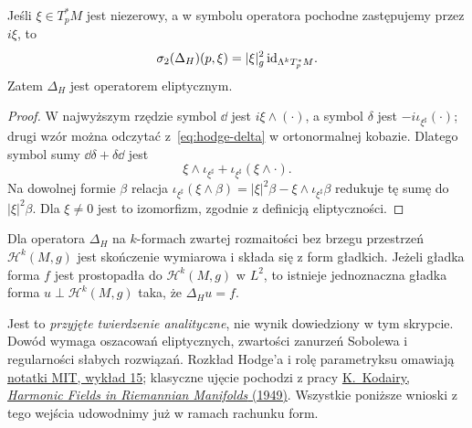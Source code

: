 \begin{stwierdzenie}
\label{prop:hodge-symbol}
Jeśli $\xi\in T_p^*M$ jest niezerowy, a w symbolu operatora
pochodne zastępujemy przez $i\xi$, to
\begin{equation}\label{eq:hodge-symbol}
 \sigma_2(\Delta_H)(p,\xi)
 =|\xi|_g^2\,\mathrm{id}_{\Lambda^kT_p^*M}.
\end{equation}
Zatem $\Delta_H$ jest operatorem eliptycznym.
\end{stwierdzenie}
\begin{proof}
W najwyższym rzędzie symbol $\dd$ jest
$i\xi\wedge(\cdot)$, a symbol $\delta$ jest
$-i\iota_{\xi^\sharp}(\cdot)$; drugi wzór można
odczytać z~\eqref{eq:hodge-delta} w ortonormalnej kobazie.
Dlatego symbol sumy $\dd\delta+\delta\dd$ jest
\[
 \xi\wedge\iota_{\xi^\sharp}
 +\iota_{\xi^\sharp}(\xi\wedge\cdot).
\]
Na dowolnej formie $\beta$ relacja
$\iota_{\xi^\sharp}(\xi\wedge\beta)
=|\xi|^2\beta-\xi\wedge\iota_{\xi^\sharp}\beta$
redukuje tę sumę do $|\xi|^2\beta$. Dla $\xi\ne0$
jest to izomorfizm, zgodnie z definicją eliptyczności.
\end{proof}

\begin{twierdzenie}
\label{thm:hodge-analytic-input}
Dla operatora $\Delta_H$ na $k$-formach zwartej
rozmaitości bez brzegu przestrzeń $\mathcal H^k(M,g)$
jest skończenie wymiarowa i składa się z form gładkich.
Jeżeli gładka forma $f$ jest prostopadła do
$\mathcal H^k(M,g)$ w $L^2$, to istnieje jednoznaczna
gładka forma $u\perp\mathcal H^k(M,g)$ taka, że
$\Delta_Hu=f$.
\end{twierdzenie}

Jest to \emph{przyjęte twierdzenie analityczne},
nie wynik dowiedziony w tym skrypcie. Dowód wymaga
oszacowań eliptycznych, zwartości zanurzeń Sobolewa i
regularności słabych rozwiązań. Rozkład Hodge'a i rolę
parametryksu omawiają
\href{https://ocw.mit.edu/courses/18-966-geometry-of-manifolds-spring-2007/d6848bb391c032ef27993e984fef4558_lect15.pdf}
{notatki MIT, wykład 15}; klasyczne ujęcie pochodzi z pracy
\href{https://doi.org/10.2307/1969552}
{K.\ Kodairy, \emph{Harmonic Fields in Riemannian Manifolds}
(1949)}. Wszystkie poniższe wnioski z tego wejścia
udowodnimy już w ramach rachunku form.


